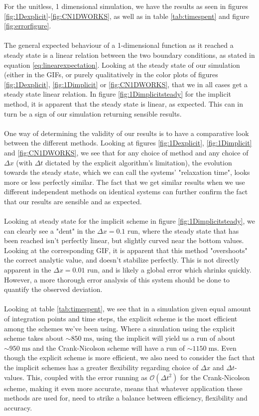 \documentclass[reprint,english,notitlepage]{revtex4-1}  %
\begin{document}
For the unitless, 1 dimensional simulation, we have the results as seen in figures \ref{fig:1Dexplicit}-\ref{fig:CN1DWORKS}, as well as in table \ref{tab:timespent} and figure \ref{fig:errorfigure}.
\\
\\
The general expected behaviour of a 1-dimensional function as it reached a steady state is a linear relation between the two boundary conditions, as stated in equation \ref{eq:linearexpectation}. Looking at the steady state of our simulation (either in the GIFs, or purely qualitatively in the color plots of figures \ref{fig:1Dexplicit}, \ref{fig:1Dimplicit} or \ref{fig:CN1DWORKS}, that we in all cases get a steady state linear relation. In figure \ref{fig:1Dimplicitsteady} for the implicit method, it is apparent that the steady state is linear, as expected. This can in turn be a sign of our simulation returning sensible results.
\\
\\
One way of determining the validity of our results is to have a comparative look between the different methods. Looking at figures \ref{fig:1Dexplicit}, \ref{fig:1Dimplicit} and \ref{fig:CN1DWORKS}, we see that for any choice of method and any choice of $\Delta x$ (with $\Delta t$ dictated by the explicit algorithm's limitation), the evolution towards the steady state, which we can call the systems' "relaxation time", looks more or less perfectly similar. The fact that we get similar results when we use different independent methods on identical systems can further confirm the fact that our results are sensible and as expected.
\\
\\
Looking at steady state for the implicit scheme in figure \ref{fig:1Dimplicitsteady}, we can clearly see a "dent" in the $\Delta x = 0.1$ run, where the steady state that has been reached isn't perfectly linear, but slightly curved near the bottom values. Looking at the corresponding GIF, it is apparent that this method "overshoots" the correct analytic value, and doesn't stabilize perfectly. This is not directly apparent in the $\Delta x = 0.01$ run, and is likely a global error which shrinks quickly. However, a more thorough error analysis of this system should be done to quantify the observed deviation.
\\
\\
Looking at table \ref{tab:timespent}, we see that in a simulation given equal amount of integration points and time steps, the explicit scheme is the most efficient among the schemes we've been using. Where a simulation using the explicit scheme takes about $\sim 850\;\text{ms}$, using the implicit will yield us a run of about $\sim 950\;\text{ms}$ and the Crank-Nicolson scheme will have a run of $\sim 1150\;\text{ms}$. Even though the explicit scheme is more efficient, we also need to consider the fact that the implicit schemes has a greater flexibility regarding choice of $\Delta x$ and $\Delta t$-values. This, coupled with the error running as $\mathcal{O}(\Delta t^2)$ for the Crank-Nicolson scheme, making it even more accurate, means that whatever application these methods are used for, need to strike a balance between efficiency, flexibility and accuracy.
\end{document}
